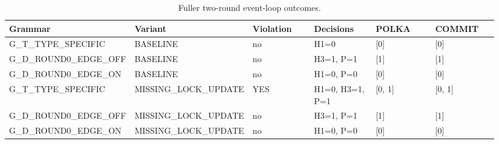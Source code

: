 \begin{table}[t]
\centering
\small
\begin{tabular}{p{0.157\linewidth}p{0.157\linewidth}p{0.157\linewidth}p{0.157\linewidth}p{0.157\linewidth}p{0.157\linewidth}}
\toprule
Grammar & Variant & Violation & Decisions & POLKA & COMMIT \\
\midrule
G\_T\_TYPE\_SPECIFIC & BASELINE & no & H1=0 & [0] & [0] \\
G\_D\_ROUND0\_EDGE\_OFF & BASELINE & no & H3=1, P=1 & [1] & [1] \\
G\_D\_ROUND0\_EDGE\_ON & BASELINE & no & H1=0, P=0 & [0] & [0] \\
G\_T\_TYPE\_SPECIFIC & MISSING\_LOCK\_UPDATE & YES & H1=0, H3=1, P=1 & [0, 1] & [0, 1] \\
G\_D\_ROUND0\_EDGE\_OFF & MISSING\_LOCK\_UPDATE & no & H3=1, P=1 & [1] & [1] \\
G\_D\_ROUND0\_EDGE\_ON & MISSING\_LOCK\_UPDATE & no & H1=0, P=0 & [0] & [0] \\
\bottomrule
\end{tabular}
\caption{Fuller two-round event-loop outcomes.}
\label{tab:table2_full_event_loop}
\end{table}
